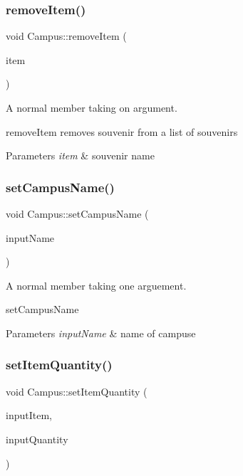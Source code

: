 \subsubsection{\texorpdfstring{remove\+Item()}{removeItem()}}
{\footnotesize\ttfamily void Campus\+::remove\+Item (\begin{DoxyParamCaption}\item[{Q\+String}]{item }\end{DoxyParamCaption})}



A normal member taking on argument. 

remove\+Item removes souvenir from a list of souvenirs 
\begin{DoxyParams}{Parameters}
{\em item} & souvenir name \\
\hline
\end{DoxyParams}
\mbox{\label{class_campus_abb6121ca36778fc41590e3e40f1c7f66}} 
\subsubsection{\texorpdfstring{set\+Campus\+Name()}{setCampusName()}}
{\footnotesize\ttfamily void Campus\+::set\+Campus\+Name (\begin{DoxyParamCaption}\item[{Q\+String}]{input\+Name }\end{DoxyParamCaption})}



A normal member taking one arguement. 

set\+Campus\+Name 
\begin{DoxyParams}{Parameters}
{\em input\+Name} & name of campuse \\
\hline
\end{DoxyParams}
\mbox{\label{class_campus_a9df6d860dce913b125409f5ecf2b61cf}} 
\subsubsection{\texorpdfstring{set\+Item\+Quantity()}{setItemQuantity()}}
{\footnotesize\ttfamily void Campus\+::set\+Item\+Quantity (\begin{DoxyParamCaption}\item[{Q\+String}]{input\+Item,  }\item[{int}]{input\+Quantity }\end{DoxyParamCaption})}



